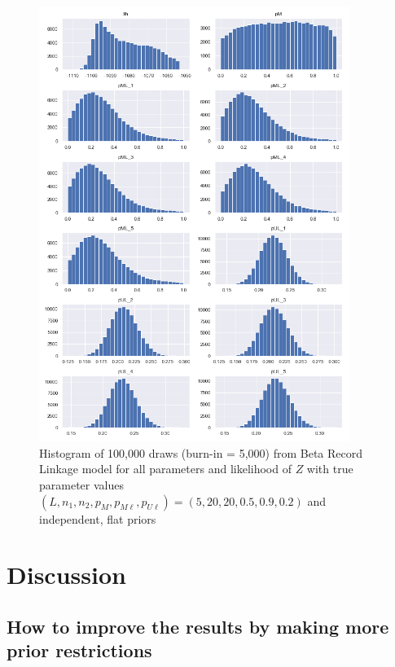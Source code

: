 \documentclass[11pt,reqno]{amsart}
\begin{document}
\begin{figure}[h!]
\begin{center}
\includegraphics[width=0.9\textwidth]{../Figures/bpm/nM10/allParam_nM10_L5.png}
\caption{Histogram of 100,000 draws (burn-in = 5,000) from Beta Record Linkage model for all parameters and likelihood of $Z$ with true parameter values $(L, n_1, n_2, p_M, p_{M\ell}, p_{U\ell}) = (5, 20, 20, 0.5, 0.9, 0.2)$ and independent, flat priors}
\label{bpmLarge}
\end{center}
\end{figure}




\section{Discussion}
\subsection{How to improve the results by making more prior restrictions}
\end{document}
